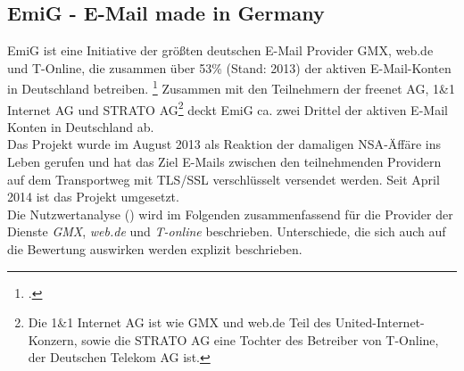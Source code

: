 \documentclass  [paper=a4,
				fontsize=12pt,
				listof=totoc,
				bibliography=totoc
				]{scrreprt}
\begin{document}
		
						
		
			
			\subsection{EmiG - E-Mail made in Germany}
			\ac{EmiG} ist eine Initiative der größten deutschen E-Mail Provider GMX, web.de und T-Online, die zusammen über 53\% (Stand: 2013) der aktiven E-Mail-Konten in Deutschland betreiben.
			\footcite[Vgl.][]{Brandt13} 
			Zusammen mit den Teilnehmern der freenet AG, 1\&1 Internet AG und STRATO AG\footnote{Die 1\&1 Internet AG ist wie GMX und web.de Teil des United-Internet-Konzern, sowie die STRATO AG eine Tochter des Betreiber von T-Online, der Deutschen Telekom AG ist.} deckt EmiG ca. zwei Drittel der aktiven E-Mail Konten in Deutschland ab.\\
			Das Projekt wurde im August 2013 als Reaktion der damaligen \ac{NSA}-Äffäre ins Leben gerufen und hat das Ziel E-Mails zwischen den teilnehmenden Providern auf dem Transportweg mit \ac{TLS/SSL} verschlüsselt versendet werden.
			Seit April 2014 ist das Projekt umgesetzt.
			\medskip\\
			Die Nutzwertanalyse () wird im Folgenden zusammenfassend für die Provider der Dienste \textit{GMX}, \textit{web.de} und \textit{T-online} beschrieben. 
			Unterschiede, die sich auch auf die Bewertung auswirken werden explizit beschrieben.
\end{document}
